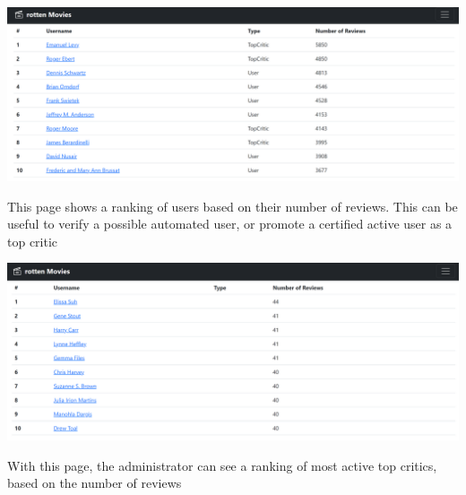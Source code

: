 \begin{center}
\includegraphics[scale=0.45]{../../../images/user_manual/most_active_users.png} 

\end{center}
\vspace{5pt}

This page shows a ranking of users based on their number of reviews. This can be useful to verify a possible automated user, or promote a certified active user as a top critic

\begin{center}
\includegraphics[scale=0.45]{../../../images/user_manual/most_followed_top_critic.png} 

\end{center}
\vspace{5pt}
With this page, the administrator can see a ranking of most active top critics, based on the number of reviews

